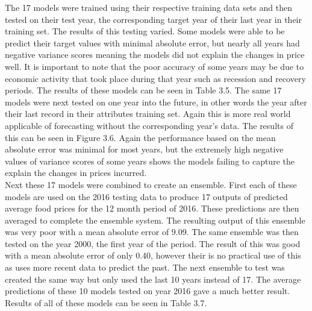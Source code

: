 \documentclass[12pt]{dalthesis}
\begin{document}
The 17 models were trained using their respective training data sets and then tested on their test year, the corresponding target year of their last year in their training set. The results of this testing varied. Some models were able to be predict their target values with minimal absolute error, but nearly all years had negative variance scores meaning the models did not explain the changes in price well. It is important to note that the poor accuracy of some years may be due to economic activity that took place during that year such as recession and recovery periods. The results of these models can be seen in Table 3.5. The same 17 models were next tested on one year into the future, in other words the year after their last record in their attributes training set. Again this is more real world applicable of forecasting without the corresponding year's data. The results of this can be seen in Figure 3.6. Again the performance based on the mean absolute error was minimal for most years, but the extremely high negative values of variance scores of some years shows the models failing to capture the explain the changes in prices incurred. \\

Next these  17 models were combined to create an ensemble. First each of these models are used on the 2016 testing data to produce 17 outputs of predicted average food prices for the 12 month period of 2016. These predictions are then averaged to complete the ensemble system.  The resulting output of this ensemble was very poor with a mean absolute error of 9.09. The same ensemble was then tested on the year 
2000, the first year of the period. The result of this was good with a mean absolute error of only 0.40, however their is no practical use of this as uses more recent data to predict the past. The next ensemble to test was created the same way but only used the last 10 years instead of 17. The average predictions of these 10 models tested on year 2016 gave a much better result. Results of all of these models can be seen in Table 3.7.\\
\end{document}
